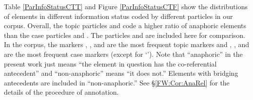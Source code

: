 Table \ref{ParInfoStatusCTT} and Figure \ref{ParInfoStatusCTF} show the distributions of elements in different information status coded by different particles in our corpus.
Overall, the topic particles  and  code a higher ratio of anaphoric elements than the case particles  and .
The particles  and  are included here for comparison.
In the corpus, the markers , , and  are the most frequent topic markers and 
, , and  are the most frequent case markers (except for  `').
Note that ``anaphoric'' in the present work just means ``the element in question has the co-referential antecedent'' and ``non-anaphoric'' means ``it does not.''
Elements with bridging antecedents are included in ``non-anaphoric.''
See \S \ref{FW:Cor:AnaRel} for the details of the procedure of annotation.
